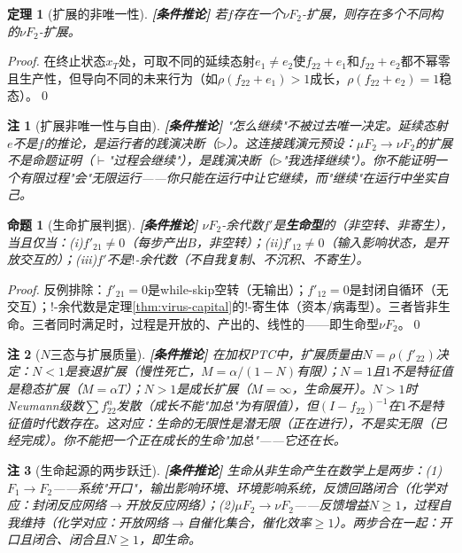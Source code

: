 \documentclass[11pt,a4paper]{article}
\newtheorem{theorem}{定理}
\newtheorem{proposition}{命题}
\newtheorem{remark}{注}
\newcommand{\lvl}[1]{\hfill\textbf{\footnotesize[#1]}}
\newcommand{\lvC}{\lvl{条件推论}}
\newcommand{\bang}{{!}}
\begin{document}
\begin{theorem}[扩展的非唯一性]\label{thm:extension-nonunique}\lvC
若$f$存在一个$\nu F_2$-扩展，则存在多个不同构的$\nu F_2$-扩展。
\end{theorem}

\begin{proof}
在终止状态$x_T$处，可取不同的延续态射$e_1\neq e_2$使$f_{22}+e_1$和$f_{22}+e_2$都不幂零且生产性，但导向不同的未来行为（如$\rho(f_{22}+e_1)>1$成长，$\rho(f_{22}+e_2)=1$稳态）。\qed
\end{proof}

\begin{remark}[扩展非唯一性与自由]\lvC
"怎么继续"不被过去唯一决定。延续态射$e$不是$f$的推论，是运行者的践演决断（$\triangleright$）。这连接践演元预设：$\mu F_2\to\nu F_2$的扩展不是命题证明（$\vdash$"过程会继续"），是践演决断（$\triangleright$"我选择继续"）。你不能证明一个有限过程"会"无限运行——你只能在运行中让它继续，而"继续"在运行中坐实自己。
\end{remark}

\begin{proposition}[生命扩展判据]\label{prop:life-extension}\lvC
$\nu F_2$-余代数$f'$是\textbf{生命型}的（非空转、非寄生），当且仅当：(i)$f'_{21}\neq 0$（每步产出$B$，非空转）；(ii)$f'_{12}\neq 0$（输入影响状态，是开放交互的）；(iii)$f'$不是$\bang$-余代数（不自我复制、不沉积、不寄生）。
\end{proposition}

\begin{proof}
反例排除：$f'_{21}=0$是while-skip空转（无输出）；$f'_{12}=0$是封闭自循环（无交互）；$\bang$-余代数是定理\ref{thm:virus-capital}的$\bang$-寄生体（资本/病毒型）。三者皆非生命。三者同时满足时，过程是开放的、产出的、线性的——即生命型$\nu F_2$。\qed
\end{proof}

\begin{remark}[$N$三态与扩展质量]\lvC
在加权PTC中，扩展质量由$N=\rho(f'_{22})$决定：$N<1$是衰退扩展（慢性死亡，$M=\alpha/(1-N)$有限）；$N=1$且$1$不是特征值是稳态扩展（$M=\alpha T$）；$N>1$是成长扩展（$M=\infty$，生命展开）。$N>1$时Neumann级数$\sum f_{22}^n$发散（成长不能"加总"为有限值），但$(I-f_{22})^{-1}$在$1$不是特征值时代数存在。这对应：生命的无限性是潜无限（正在进行），不是实无限（已经完成）。你不能把一个正在成长的生命"加总"——它还在长。
\end{remark}

\begin{remark}[生命起源的两步跃迁]\lvC
生命从非生命产生在数学上是两步：(1)$F_1\to F_2$——系统"开口"，输出影响环境、环境影响系统，反馈回路闭合（化学对应：封闭反应网络$\to$开放反应网络）；(2)$\mu F_2\to\nu F_2$——反馈增益$N\geq1$，过程自我维持（化学对应：开放网络$\to$自催化集合，催化效率$\geq1$）。两步合在一起：开口且闭合、闭合且$N\geq1$，即生命。
\end{remark}
\end{document}
